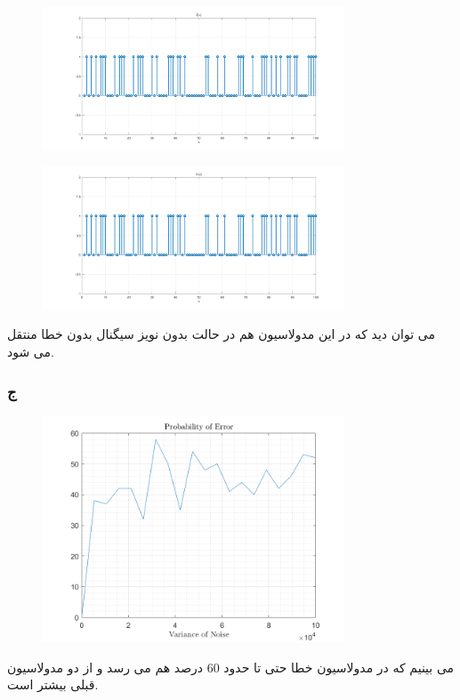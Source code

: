 \documentclass[a4paper]{article}
\begin{document}
	\begin{figure}[H]
		\includegraphics[width=0.8\textwidth]{comsys_fig47.png}\\ 
		\centering
	\end{figure}
	\begin{figure}[H]
		\includegraphics[width=0.8\textwidth]{comsys_fig48.png}\\ 
		\centering
	\end{figure}
	می توان دید که در این مدولاسیون هم در حالت بدون نویز سیگنال بدون خطا منتقل می شود.
	\subsubsection*{ج}
	\begin{figure}[H]
		\includegraphics[width=0.8\textwidth]{comsys_fig49.png}\\ 
		\centering
	\end{figure}
	می بینیم که در مدولاسیون  خطا حتی تا حدود 60 درصد هم می رسد و از دو مدولاسیون قبلی بیشتر است.
\end{document}
